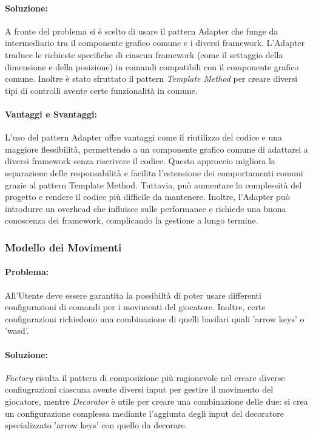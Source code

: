\documentclass[a4paper,12pt]{report}
\begin{document}
	\paragraph{Soluzione:}A fronte del problema si è scelto di usare il pattern {Adapter} che funge da intermediario tra il componente grafico comune e i diversi framework. L'Adapter traduce le richieste specifiche di ciascun framework (come il settaggio della dimensione e della posizione) in comandi compatibili con il componente grafico comune. Inoltre è stato sfruttato il pattern \textit{Template Method} per creare diversi tipi di controlli avente certe funzionalità in comune.
	
	\paragraph{Vantaggi e Svantaggi:} L'uso del pattern Adapter offre vantaggi come il riutilizzo del codice e una maggiore flessibilità, permettendo a un componente grafico comune di adattarsi a diversi framework senza riscrivere il codice. Questo approccio migliora la separazione delle responsabilità e facilita l'estensione dei comportamenti comuni grazie al pattern Template Method. Tuttavia, può aumentare la complessità del progetto e rendere il codice più difficile da mantenere. Inoltre, l'Adapter può introdurre un overhead che influisce sulle performance e richiede una buona conoscenza dei framework, complicando la gestione a lungo termine.
	
	
	\subsubsection{Modello dei Movimenti}
	
	\paragraph{Problema:} All'Utente deve essere garantita la possibiltà di poter usare differenti configurazioni di comandi per i movimenti del giocatore. Inoltre, certe configurazioni richiedono una combinazione di quelli basilari quali 'arrow keys' o 'wasd'.
	
	\paragraph{Soluzione:} \textit{Factory} risulta il pattern di composizione più ragionevole nel creare diverse confiugrazioni ciascuna avente diversi input per gestire il movimento del giocatore, mentre \textit{Decorator} è utile per creare una combinazione delle due: si crea un configurazione complessa mediante l'aggiunta degli input del decoratore specializzato 'arrow keys' con quello da decorare.
	
\end{document}

